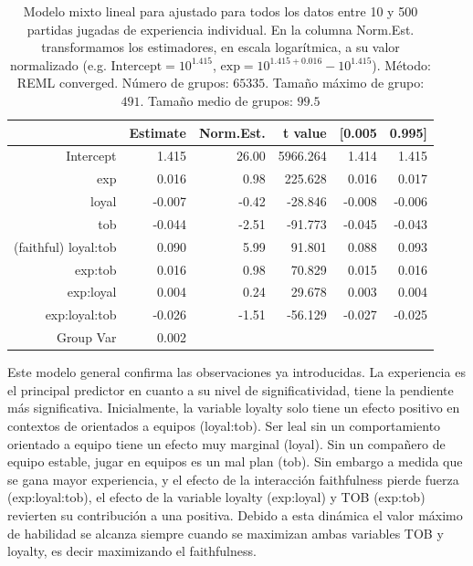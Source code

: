 \documentclass[a4paper,11pt]{book}
\theoremstyle{definition}
\begin{document}
\begin{table}[ht!]
\centering
\begin{tabular}{rrrrrr}

 & Estimate & Norm.Est. & t value  & [0.005 & 0.995] \\
  \hline
Intercept               &  1.415  &  26.00   & 5966.264  &  1.414 &  1.415 \\
exp           		&  0.016  &   0.98   &  225.628  &  0.016 &  0.017 \\
loyal         		& -0.007  &  -0.42   &  -28.846  & -0.008 & -0.006 \\
tob           		& -0.044  &  -2.51   &  -91.773  & -0.045 & -0.043 \\
(faithful) loyal:tob    &  0.090  &   5.99   &   91.801  &  0.088 &  0.093 \\
exp:tob       		&  0.016  &   0.98   &   70.829  &  0.015 &  0.016 \\
exp:loyal     		&  0.004  &   0.24   &   29.678  &  0.003 &  0.004 \\
exp:loyal:tob 		& -0.026  &  -1.51   &  -56.129  & -0.027 & -0.025 \\
Group Var     		&  0.002  &          &           &        &       \\
   \hline
\end{tabular}
\caption{
Modelo mixto lineal para ajustado para todos los datos entre 10 y 500 partidas jugadas de experiencia individual.
%
En la columna Norm.Est. transformamos los estimadores, en escala logar\'itmica, a su valor normalizado (e.g. $\text{Intercept} = 10^{1.415}$, $\text{exp} = 10^{1.415+0.016} - 10^{1.415}$).
%
M\'etodo: REML converged. N\'umero de grupos: $65335$. Tama\~no m\'aximo de grupo: $491$. Tama\~no medio de grupos: $99.5$}
\label{lmm}
\end{table}

Este modelo general confirma las observaciones ya introducidas.
%
La experiencia es el principal predictor en cuanto a su nivel de significatividad, tiene la pendiente m\'as significativa.
%
Inicialmente, la variable loyalty solo tiene un efecto positivo en contextos de orientados a equipos (loyal:tob).
%
Ser leal sin un comportamiento orientado a equipo tiene un efecto muy marginal (loyal).
%
Sin un compa\~nero de equipo estable, jugar en equipos es un mal plan (tob).
%
Sin embargo a medida que se gana mayor experiencia, y el efecto de la interacci\'on faithfulness pierde fuerza (exp:loyal:tob), el efecto de la variable loyalty (exp:loyal) y TOB (exp:tob) revierten su contribuci\'on a una positiva.
%
Debido a esta din\'amica el valor m\'aximo de habilidad se alcanza siempre cuando se maximizan ambas variables TOB y loyalty, es decir maximizando el faithfulness.
\end{document}
